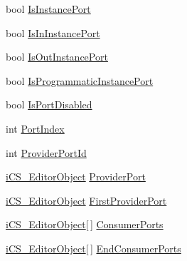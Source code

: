 \begin{DoxyCompactItemize}
bool \hyperlink{classi_c_s___editor_object_ad11b94908309182e476ca1b9ddea4363}{Is\+Instance\+Port}
\item 
bool \hyperlink{classi_c_s___editor_object_a507e0ee2db1177094f69e7ee05db8dcd}{Is\+In\+Instance\+Port}
\item 
bool \hyperlink{classi_c_s___editor_object_af31d10e62033b487a792e18c8f52aa16}{Is\+Out\+Instance\+Port}
\item 
bool \hyperlink{classi_c_s___editor_object_a18f0e711a9bee6a4b1b91277d1b7eaf3}{Is\+Programmatic\+Instance\+Port}
\item 
bool \hyperlink{classi_c_s___editor_object_a35b610bad3dcafc52c829b00b9a82ed3}{Is\+Port\+Disabled}
\item 
int \hyperlink{classi_c_s___editor_object_ad9ccd943aa75fa42d089a5f07815d566}{Port\+Index}
\item 
int \hyperlink{classi_c_s___editor_object_ac4fb7a1d259018da94a8c9989d85945b}{Provider\+Port\+Id}
\item 
\hyperlink{classi_c_s___editor_object}{i\+C\+S\+\_\+\+Editor\+Object} \hyperlink{classi_c_s___editor_object_a3d3b896d8808126cc25aa0b53174bee7}{Provider\+Port}
\item 
\hyperlink{classi_c_s___editor_object}{i\+C\+S\+\_\+\+Editor\+Object} \hyperlink{classi_c_s___editor_object_a772411f30de3cb27405d591520821c68}{First\+Provider\+Port}
\item 
\hyperlink{classi_c_s___editor_object}{i\+C\+S\+\_\+\+Editor\+Object}\mbox{[}$\,$\mbox{]} \hyperlink{classi_c_s___editor_object_a180b74496aa9a357cc7cbd104c006fba}{Consumer\+Ports}
\item 
\hyperlink{classi_c_s___editor_object}{i\+C\+S\+\_\+\+Editor\+Object}\mbox{[}$\,$\mbox{]} \hyperlink{classi_c_s___editor_object_a1f197169f9b56067de530368b0b8c25f}{End\+Consumer\+Ports}

\end{DoxyCompactItemize}

